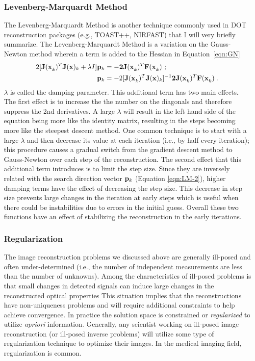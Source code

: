 \begin{enumerate}[noitemsep]
\subsubsection{Levenberg-Marquardt Method}
The Levenberg-Marquardt Method is another technique commonly used in DOT reconstruction packages (e.g., TOAST++, NIRFAST) that I will very briefly summarize. The Levenberg-Marquardt Method is a variation on the Gauss-Newton method wherein a term is added to the Hessian in Equation~\ref{eqn:GN}
\begin{align}
2[\mathbf{J(x}_k)^T\mathbf{J(x})_k+\lambda I]\mathbf{p}_k &= -\mathbf{2J(x}_k)^T \mathbf{F(x}_k)\ ; \label{eqn:LM-2}\\
\mathbf{p}_k &= -2[\mathbf{J(x}_k)^T\mathbf{J(x})_k]^{-1}\mathbf{2J(x}_k)^T \mathbf{F(x}_k) \label{eqn:LM-2}\ .
\end{align}
$\lambda$ is called the damping parameter. This additional term has two main effects. The first effect is to increase the the number on the diagonals and therefore suppress the 2nd derivatives. A large $\lambda$ will result in the left hand side of the equation being more like the identity matrix, resulting in the steps becoming more like the steepest descent method. One common technique is to start with a large $\lambda$ and then decrease its value at each iteration (i.e., by half every iteration); this procedure causes a gradual switch from the gradient descent method to Gauss-Newton over each step of the reconstruction. The second effect that this additional term introduces is to limit the step size. Since they are inversely related with the search direction vector $\mathbf{p}_k$ (Equation \ref{eqn:LM-2}), higher damping terms have the effect of decreasing the step size. This decrease in step size prevents large changes in the iteration at early steps which is useful when there could be instabilities due to errors in the initial guess. Overall these two functions have an effect of stabilizing the reconstruction in the early iterations.

\subsubsection{Regularization}
\label{sec:reg}
The image reconstruction problems we discussed above are generally ill-posed  and often under-determined (i.e., the number of independent measurements are less than the number of unknowns). Among the characteristics of ill-posed problems is that small changes in detected signals can induce large changes in the reconstructed optical properties This situation implies that the reconstructions have non-uniqueness problems and will require additional constraints to help achieve convergence. In practice the solution space is constrained or \textit{regularized} to utilize \textit{apriori} information. Generally, any scientist working on ill-posed image reconstruction (or ill-posed inverse problems) will utilize some type of regularization technique to optimize their images. In the medical imaging field, regularization is common.


\end{enumerate}
